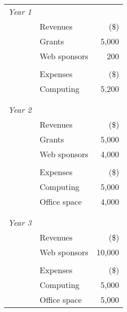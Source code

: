 \documentclass[12pt]{article}
\begin{document}
\begin{tabular}{llr}
\emph{Year 1} &               &         \\
              & Revenues      &   (\$)  \\
              &  Grants       &  5,000  \\
              & Web sponsors  &    200  \\
              &               &         \\
              & Expenses      &   (\$)  \\
              &  Computing    &  5,200  \\
              &               &         \\
              &               &         \\
\emph{Year 2} &               &        \\
              & Revenues      &   (\$)  \\
              &  Grants       &  5,000  \\
              & Web sponsors  &  4,000  \\
              &               &         \\
              & Expenses      &   (\$)  \\
              &  Computing    &  5,000  \\
              &  Office space &  4,000  \\
              &               &         \\
              &               &         \\
\emph{Year 3} &               &        \\
              & Revenues      &   (\$)  \\
              & Web sponsors  &  10,000 \\
              &               &         \\
              & Expenses      &   (\$)  \\
              &  Computing    &  5,000  \\
              &  Office space &  5,000  \\
\end{tabular}
\end{document}
